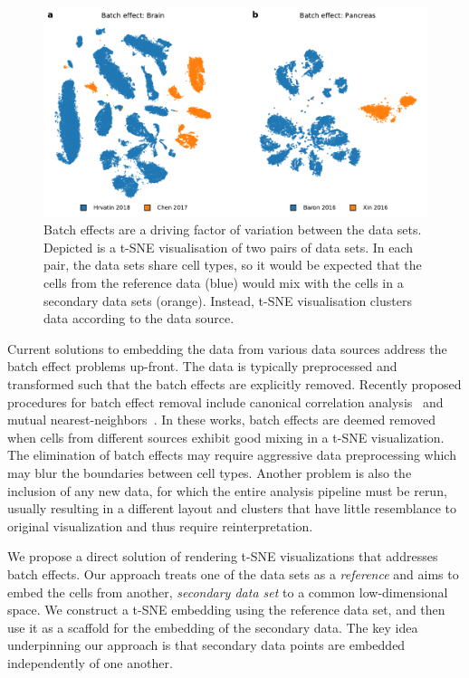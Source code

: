 \documentclass[runningheads]{llncs}
\begin{document}
\begin{figure}[htbp]
\includegraphics[width=\textwidth]{figures/batch_effect.pdf}
\caption{Batch effects are a driving factor of variation between the data sets.
Depicted is a t-SNE visualisation of two pairs of data sets. In each pair, the
data sets share cell types, so it would be expected that the cells from the
reference data (blue) would mix with the cells in a secondary data sets
(orange). Instead, t-SNE visualisation clusters data according to the data
source.} \label{fig:batch_effect}
\end{figure}

Current solutions to embedding the data from various data sources address the
batch effect problems up-front. The data is typically preprocessed and
transformed such that the batch effects are explicitly
removed. Recently proposed procedures for batch effect removal include
canonical correlation analysis~\cite{cca} and mutual
nearest-neighbors~\cite{mnn,seurat}.
In these works, batch effects are deemed removed when cells from different sources exhibit good mixing in a t-SNE visualization.
The elimination of batch effects may require aggressive data
preprocessing which may blur the boundaries between cell types. Another problem
is also the inclusion of any new data, for which the entire analysis
pipeline must be rerun, usually resulting in a different layout and clusters
that have little resemblance to original visualization and thus require
reinterpretation.

We propose a direct solution of rendering t-SNE visualizations that addresses
batch effects. Our approach treats one of the data sets as a {\em reference}
and aims to embed the cells from another, {\em secondary data set} to a common low-dimensional space.
We construct a t\nobreakdash -SNE embedding using the reference data set, and then use it
as a scaffold for the embedding of the secondary data.
The key idea underpinning our approach is that secondary data points are embedded
independently of one another.
\end{document}
